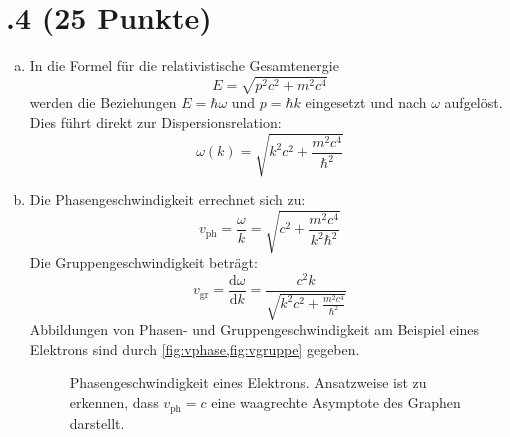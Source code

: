 \section*{\nr.4 \titfour (25 Punkte)}
\begin{enumerate}[(a)]
\item In die Formel für die relativistische Gesamtenergie
\begin{equation}
E = \sqrt{p^2c^2+m^2c^4}
\end{equation}
werden die Beziehungen $E=\hbar \omega$ und $p= \hbar k$ eingesetzt und nach $\omega$ aufgelöst. Dies führt direkt zur Dispersionsrelation:
\begin{equation}
\omega(k) = \sqrt{k^2c^2+\frac{m^2c^4}{\hbar^2}}
\label{eq:disp}
\end{equation}
\item Die Phasengeschwindigkeit errechnet sich zu:
\begin{equation}
v_\text{ph} = \frac{\omega}{k} = \sqrt{c^2+\frac{m^2c^4}{k^2\hbar^2}}
\end{equation}
Die Gruppengeschwindigkeit beträgt:
\begin{equation}
v_\text{gr} = \frac{\mathrm{d}\omega}{\mathrm{d}k} = \frac{c^2 k}{\sqrt{k^2c^2+\frac{m^2c^4}{\hbar^2}}}
\end{equation}
Abbildungen von Phasen- und Gruppengeschwindigkeit am Beispiel eines Elektrons sind durch \vref{fig:vphase,fig:vgruppe} gegeben.
\begin{figure}[htbp]
\centering

\caption{Phasengeschwindigkeit eines Elektrons. Ansatzweise ist zu erkennen, dass $v_\text{ph}=c$ eine waagrechte Asymptote des Graphen darstellt.}
\label{fig:vphase}
\end{figure}


\end{enumerate}
